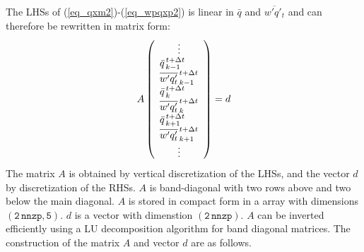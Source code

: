 \documentclass[11pt,fleqn]{article}
\begin{document}
%
The LHSs of (\ref{eq_qxm2})-(\ref{eq_wpqxp2}) is linear in $\bar{q}$
and $\overline{w'q'_t}$ and can therefore be rewritten in matrix form:
%
\begin{equation}
A
\left( \begin{array}{l}
  \hfill \vdots \hfill \\
  \bar{q}^{\, t+\Delta t}_{\, k-1} \\
  \overline{w'q'_t}^{\, t+\Delta t}_{\, k-1} \\
  \bar{q}^{\, t+\Delta t}_{\, k} \\
  \overline{w'q'_t}^{\, t+\Delta t}_{\, k} \\
  \bar{q}^{\, t+\Delta t}_{\, k+1} \\
  \overline{w'q'_t}^{\, t+\Delta t}_{\, k+1} \\
  \hfill \vdots \hfill
\end{array} \right)
= d
\end{equation}
%
The matrix $A$ is obtained by vertical discretization of the LHSs,
and the vector $d$ by discretization of the RHSs. $A$ is band-diagonal
with two rows above and two below the main diagonal. $A$ is stored
in compact form in a array with dimensions $\mathtt{(2\,nnzp, 5)}$.
$d$ is a vector with dimenstion $\mathtt{(2\,nnzp)}$.
$A$ can be inverted efficiently using a LU decomposition algorithm for 
band diagonal matrices.
The construction of the matrix $A$ and vector $d$ are as follows. 
\end{document}

